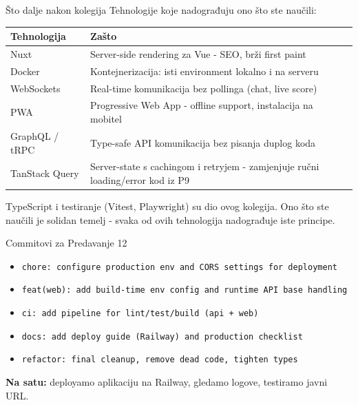 \begin{frame}[shrink=10]{Što dalje nakon kolegija}
Tehnologije koje nadograđuju ono što ste naučili:

\vspace{0.4em}
\begin{tabular}{@{}lp{8cm}@{}}
  \toprule
  \textbf{Tehnologija} & \textbf{Zašto} \\
  \midrule
  Nuxt & Server-side rendering za Vue - SEO, brži first paint \\
  Docker & Kontejnerizacija: isti environment lokalno i na serveru \\
  WebSockets & Real-time komunikacija bez pollinga (chat, live score) \\
  PWA & Progressive Web App - offline support, instalacija na mobitel \\
  GraphQL / tRPC & Type-safe API komunikacija bez pisanja duplog koda \\
  TanStack Query & Server-state s cachingom i retryjem - zamjenjuje ručni loading/error kod iz P9 \\
  \bottomrule
\end{tabular}

\vspace{0.6em}
TypeScript i testiranje (Vitest, Playwright) su dio ovog kolegija. Ono što ste naučili je solidan temelj - svaka od ovih tehnologija nadograđuje iste principe.
\end{frame}

\begin{frame}{Commitovi za Predavanje 12}
\begin{itemize}
  \item \texttt{chore: configure production env and CORS settings for deployment}
  \item \texttt{feat(web): add build-time env config and runtime API base handling}
  \item \texttt{ci: add pipeline for lint/test/build (api + web)}
  \item \texttt{docs: add deploy guide (Railway) and production checklist}
  \item \texttt{refactor: final cleanup, remove dead code, tighten types}
\end{itemize}

\vspace{0.4em}
\textbf{Na satu:} deployamo aplikaciju na Railway, gledamo logove, testiramo javni URL.
\end{frame}

